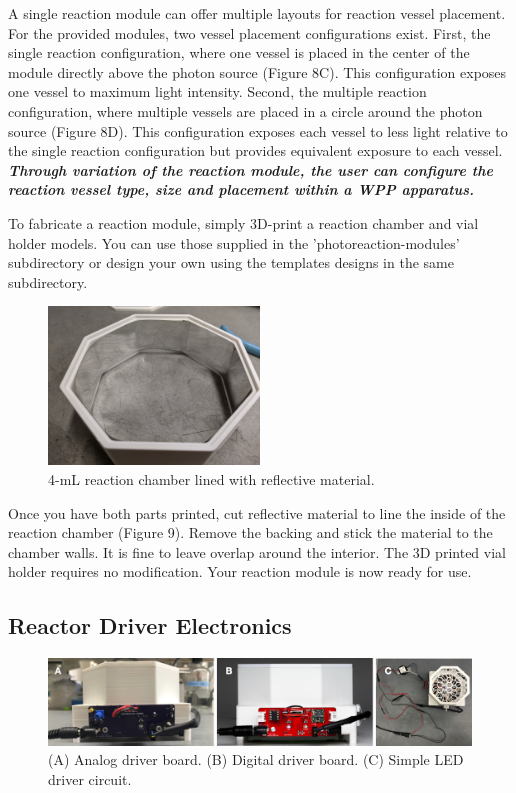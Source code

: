\documentclass[11pt]{article}
\begin{document}
A single reaction module can offer multiple layouts for reaction vessel placement.
For the provided modules, two vessel placement configurations exist.
First, the single reaction configuration, where one vessel is placed in the center of the module directly above the photon source (Figure 8C).
This configuration exposes one vessel to maximum light intensity.
Second, the multiple reaction configuration, where multiple vessels are placed in a circle around the photon source (Figure 8D).
This configuration exposes each vessel to less light relative to the single reaction configuration but provides equivalent exposure to each vessel.
\textbf{\textit{Through variation of the reaction module, the user can configure the reaction vessel type, size and placement within a WPP apparatus.}}

To fabricate a reaction module, simply 3D-print a reaction chamber and vial holder models. You can use those supplied in the 'photoreaction-modules' subdirectory or design your own using the templates designs in the same subdirectory. 

\begin{figure}[H]
	\centering
	\includegraphics[width=0.5\textwidth]{"./fig9.jpg"}
	\caption{4-mL reaction chamber lined with reflective material.}
\end{figure}

Once you have both parts printed, cut reflective material to line the inside of the reaction chamber (Figure 9).
Remove the backing and stick the material to the chamber walls.
It is fine to leave overlap around the interior.
The 3D printed vial holder requires no modification.
Your reaction module is now ready for use. 

\clearpage

\subsection{Reactor Driver Electronics} \label{SEC:electronics}

\begin{figure}[H]
	\centering
	\includegraphics[width=\textwidth]{"./fig10.png"}
	\caption{(A) Analog driver board. (B) Digital driver board. (C) Simple LED driver circuit.}
\end{figure}
\end{document}

